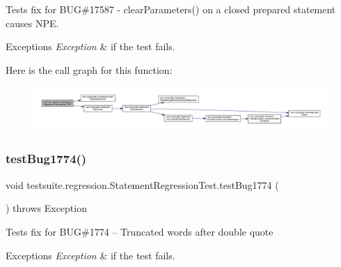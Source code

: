 Tests fix for B\+UG\#17587 -\/ clear\+Parameters() on a closed prepared statement causes N\+PE.


\begin{DoxyExceptions}{Exceptions}
{\em Exception} & if the test fails. \\
\hline
\end{DoxyExceptions}
Here is the call graph for this function\+:
\nopagebreak
\begin{figure}[H]
\begin{center}
\leavevmode
\includegraphics[width=350pt]{classtestsuite_1_1regression_1_1_statement_regression_test_a31f8a70535a902a36164d60c222d0430_cgraph}
\end{center}
\end{figure}
\mbox{\label{classtestsuite_1_1regression_1_1_statement_regression_test_add9e8195c4dbc3b4b95a1bc7ee5f5066}} 
\subsubsection{\texorpdfstring{test\+Bug1774()}{testBug1774()}}
{\footnotesize\ttfamily void testsuite.\+regression.\+Statement\+Regression\+Test.\+test\+Bug1774 (\begin{DoxyParamCaption}{ }\end{DoxyParamCaption}) throws Exception}

Tests fix for B\+UG\#1774 -- Truncated words after double quote


\begin{DoxyExceptions}{Exceptions}
{\em Exception} & if the test fails. \\
\hline
\end{DoxyExceptions}
\mbox{\label{classtestsuite_1_1regression_1_1_statement_regression_test_a0f8ea527be14f3f0a245ffcfb36f0c58}} 
